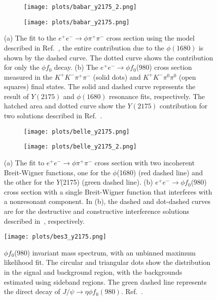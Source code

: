 \begin{figure}[H]
    \centering
    \begin{subfigure}[b]{0.5\textwidth}
        \texttt{[image: plots/babar\_y2175\_2.png]}
        \caption{}
        \label{fig.1.4.1.a}
    \end{subfigure}\hfill
    \begin{subfigure}[b]{0.5\textwidth}
        \texttt{[image: plots/babar\_y2175.png]}
        \caption{}
        \label{fig.1.4.1.b}
     \end{subfigure}
     \caption{(a) The fit to the $e^{+}e^{-}\rightarrow \phi \pi^{+} \pi^{-}$ cross section using the model described in Ref.~\cite{Aubert12}, the entire contribution due to the $\phi(1680)$ is shown by the dashed curve. The dotted curve shows the contribution for only the $\phi f_0$ decay. (b) The $e^+e^- \rightarrow \phi f_0$(980) cross section measured in the $K^{+}K^{-}\pi^{+}\pi^{-}$ (solid dots) and $K^{+}K^{-}\pi^{0}\pi^{0}$ (open squares) final states. The solid and dashed curve represents the result of $Y(2175)$ and $\phi(1680)$ resonance fits, respectively. The hatched area and dotted curve show the $Y(2175)$ contribution for two solutions described in Ref.~\cite{Aubert12}. }
    \label{fig.1.4.1}
\end{figure}

\begin{figure}[H]
    \centering
    \begin{subfigure}[b]{0.51\textwidth}
        \texttt{[image: plots/belle\_y2175.png]}
        \caption{}
        \label{fig.1.4.2.a}
    \end{subfigure}\hfill
    \begin{subfigure}[b]{0.49\textwidth}
        \texttt{[image: plots/belle\_y2175\_2.png]}
        \caption{}
        \label{fig.1.4.2.b}
     \end{subfigure}
     \caption{(a) The fit to $e^+e^- \rightarrow \phi \pi^+\pi^-$ cross section with two incoherent Breit-Wigner functions, one for the $\phi$(1680) (red dashed line) and the other for the $Y$(2175) (green dashed line). (b) $e^+e^- \rightarrow \phi f_0$(980) cross section with a single Breit-Wigner function that interferes with a nonresonant component. In (b), the dashed and dot-dashed curves are for the destructive and constructive interference solutions described in~\cite{Shen09}, respectively.}
     \label{fig.1.4.2}
\end{figure}

\begin{figure}[H]
    \centering
        \texttt{[image: plots/bes3\_y2175.png]}
        \caption{$\phi f_0$(980) invariant mass spectrum, with an unbinned maximum likelihood fit. The circular and triangular dots show the distribution in the signal and background region, with the backgrounds estimated using sideband regions. The green dashed line represents the direct decay of $J/\psi \rightarrow \eta \phi f_0(980)$. Ref.~\cite{Ablikim15}.}
        \label{fig.1.4.3}
\end{figure}
